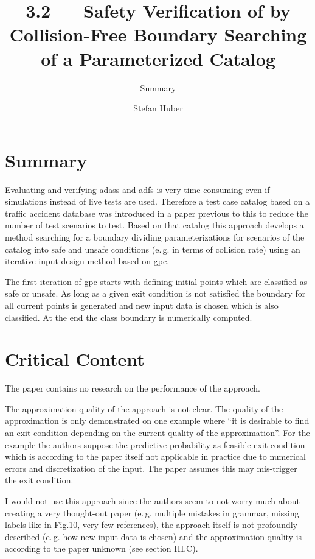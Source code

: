 \documentclass[oneside, notitlepage, twocolumn]{scrartcl}
\title{\LARGE 3.2 --- Safety Verification of \glsname{adas} by Collision-Free Boundary Searching of a Parameterized Catalog}
\subtitle{Summary}
\author{Stefan Huber}
\newcommand{\eg}{e.\,g.\xspace}
\begin{document}
\maketitle

\section{Summary}
Evaluating and verifying \glspl{adas} and \glspl{adf} is very time consuming even if simulations instead of live tests are used.
Therefore a test case catalog based on a traffic accident database was introduced in a paper previous to this to reduce the number of test scenarios to test.
Based on that catalog this approach develops a method searching for a boundary dividing parameterizations for scenarios of the catalog into safe and unsafe conditions (\eg{} in terms of collision rate) using an iterative input design method based on \gls{gpc}.\par
The first iteration of \gls{gpc} starts with defining initial points which are classified as safe or unsafe.
As long as a given exit condition is not satisfied the boundary for all current points is generated and new input data is chosen which is also classified.
At the end the class boundary is numerically computed.

\section{Critical Content}
The paper contains no research on the performance of the approach.\par
The approximation quality of the approach is not clear.
The quality of the approximation is only demonstrated on one example where ``it is desirable to find an exit condition depending on the current quality of the approximation''.
For the example the authors suppose the predictive probability as feasible exit condition which is according to the paper itself not applicable in practice due to numerical errors and discretization of the input.
The paper assumes this may mis-trigger the exit condition.\par
I would not use this approach since the authors seem to not worry much about creating a very thought-out paper (\eg{} multiple mistakes in grammar, missing labels like in Fig.10, very few references), the approach itself is not profoundly described (\eg{} how new input data is chosen) and the approximation quality is according to the paper unknown (see section III.C).
\end{document}
